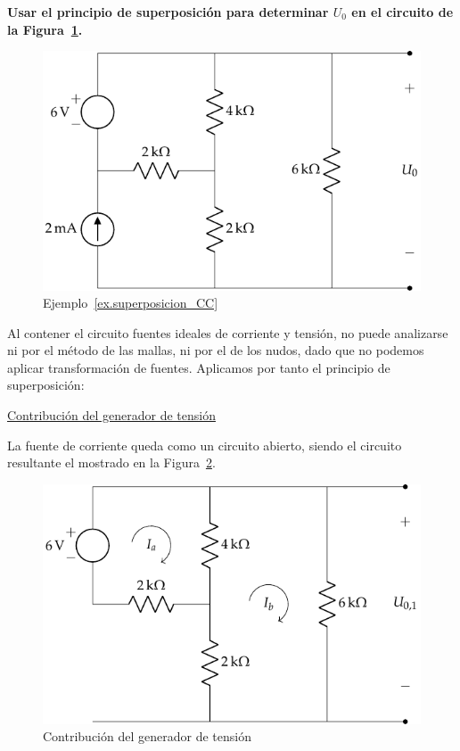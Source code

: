 \begin{example}\label{ex.superposicion_CC}
    \textbf{Usar el principio de superposición para determinar $U_0$ en el circuito de la Figura~\ref{fig.ej_superposicion_cc}.}
    \begin{figure}[H]
        \centering
        \includegraphics[width=0.6\linewidth]{../figs/ej_superposicion_cc.pdf}
        \caption{Ejemplo~\ref{ex.superposicion_CC}}
        \label{fig.ej_superposicion_cc}
    \end{figure}

    Al contener el circuito fuentes ideales de corriente y tensión, no puede analizarse ni por el método de las mallas, ni por el de los nudos, dado que no podemos aplicar transformación de fuentes. Aplicamos por tanto el principio de superposición:

    \vspace{3mm}
    \underline{Contribución del generador de tensión}

    \vspace{2mm}
    La fuente de corriente queda como un circuito abierto, siendo el circuito resultante el mostrado en la Figura~\ref{fig.ej_superposicion_cc_tension}. 
    \begin{figure}[H]
        \centering
        \includegraphics[width=0.6\linewidth]{../figs/ej_superposicion_cc_tension.pdf}
        \caption{Contribución del generador de tensión}
        \label{fig.ej_superposicion_cc_tension}
    \end{figure}
    

\end{example}
